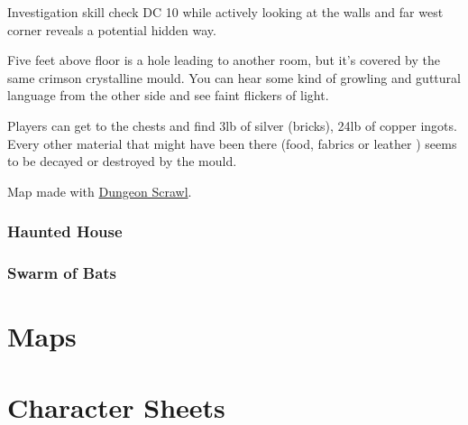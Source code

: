 \documentclass[10pt,onecolumn,twoside,openany,bg=full,layout=true]{dndbook}
\begin{document}
Investigation skill check DC 10 while actively looking at the walls and far west corner reveals a potential hidden way.
\begin{DndReadAloud}
Five feet above floor is a hole leading to another room, but it's covered by the same crimson crystalline mould.
You can hear some kind of growling and guttural language from the other side and see faint flickers of light.
\end{DndReadAloud}

Players can get to the chests and find 3lb of silver (bricks), 24lb of copper ingots.
Every other material that might have been there (food, fabrics or leather ) seems to be decayed or destroyed by the mould.

Map made with \href{https://probabletrain.itch.io/dungeon-scrawl}{Dungeon Scrawl}.



\subsection{Haunted House}\label{subsec:haunted-house}
\lipsum[1]

\subsection{Swarm of Bats}\label{subsec:swarm-of-bats}
\lipsum[1]

\vfill
\newpage

\chapter{Maps}\label{ch:maps}

\chapter{Character Sheets}\label{ch:charactersheets}
\end{document}
